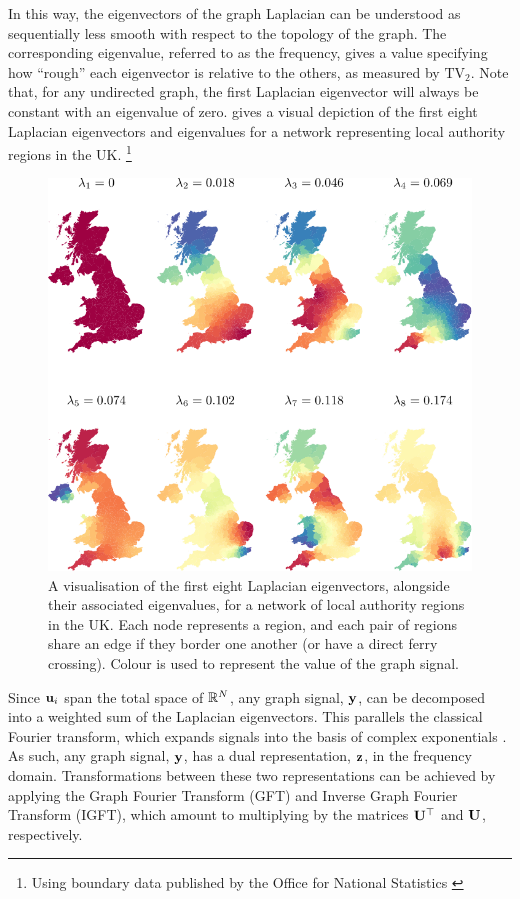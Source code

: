 \newpage

In this way, the eigenvectors of the graph Laplacian can be understood as sequentially less smooth with respect to the topology of the graph. The corresponding eigenvalue, referred to as the frequency, gives a value specifying how ``rough'' each eigenvector is relative to the others, as measured by $\text{TV}_2$. Note that, for any undirected graph, the first Laplacian eigenvector will always be constant with an eigenvalue of zero.  gives a visual depiction of the first eight Laplacian eigenvectors and eigenvalues for a network representing local authority regions in the UK. \footnote{Using boundary data published by the Office for National Statistics \citep{ONS2019}}  

\begin{figure}[t]
	\centering
		\includegraphics[width=0.85\linewidth]{Figures/uk_plot.pdf}
        \caption[A visualisation of the Laplacian eigenvectors for a network of regions in the UK]{A visualisation of the first eight Laplacian eigenvectors, alongside their associated eigenvalues, for a network of local authority regions in the UK. Each node represents a region, and each pair of regions share an edge if they border one another (or have a direct ferry crossing). Colour is used to represent the value of the graph signal.  }
	\label{fig:uk_eigs}
\end{figure}


Since ${\mathbf{u}_i}$ span the total space of $\mathbb{R}^N$, any graph signal, $\mathbf{y}$, can be decomposed into a weighted sum of the Laplacian eigenvectors. This parallels the classical Fourier transform, which expands signals into the basis of complex exponentials \citep{Sneddon1995}. As such, any graph signal, $\mathbf{y}$, has a dual representation, $\mathbf{z}$, in the frequency domain. Transformations between these two representations can be achieved by applying the Graph Fourier Transform (GFT) and Inverse Graph Fourier Transform (IGFT), which amount to multiplying by the matrices $\mathbf{U}^\top$ and $\mathbf{U}$, respectively.

